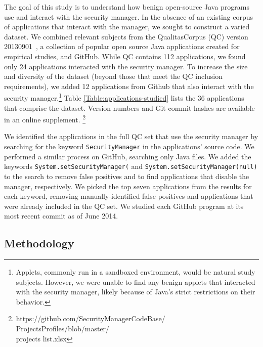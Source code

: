 \documentclass{sig-alternate}
\begin{document}
The goal of this study is to understand how benign open-source Java programs use
and interact with the security manager.  In the absence of an existing corpus of
applications that interact with the manager, we sought to construct a varied dataset.
We combined relevant subjects from 
the QualitasCorpus (QC) version 20130901~\cite{QualitasCorpus:APSEC:2010}, a 
collection of popular open source Java applications created for empirical
studies, and GitHub.
While QC contains 112 applications, we found only 24 applications interacted with 
the security manager.  To increase the size and diversity of the dataset (beyond
those that meet the QC inclusion requirements), we
added 12 applications from Github that also interact with the security manager.\footnote{Applets, commonly
run in a sandboxed environment, would be natural study subjects.  However, we were unable
to find any benign applets that interacted with the security manager, likely
because of Java's strict restrictions on their behavior.}
 Table
\ref{Table:applications-studied} lists the 36 applications that comprise the
dataset.  Version numbers
and Git commit hashes are available in an online supplement.%
\footnote{https://github.com/SecurityManagerCodeBase/\\
ProjectsProfiles/blob/master/\\
projects list.xlsx}

We identified the applications in the full QC set that use the security
manager by searching for the keyword \texttt{SecurityManager} in the applications'
source code.  We performed a similar process on
GitHub, searching only Java files. We added the keywords
\texttt{System.setSecurityManager(} and \texttt{System.setSecurityManager(null)}
to the search to remove false positives and to find applications that disable the
manager, respectively. We picked the top seven applications from the results for each keyword,
removing manually-identified false positives and applications that were
already included in the QC set. We studied each GitHub program at its most
recent commit as of June 2014.

\subsection{Methodology}
\label{sec:methodology}
\end{document}
